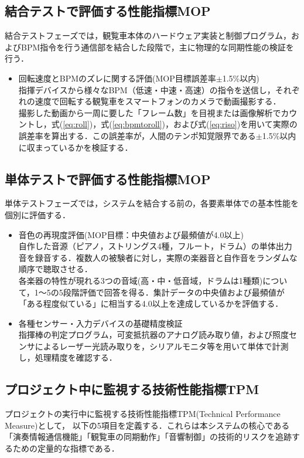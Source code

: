 \documentclass[lualatex,book,paper=a4paper,jafontsize=11.5pt,jafontscale=1.05]{jlreq}
\begin{document}
\subsection{結合テストで評価する性能指標MOP}
結合テストフェーズでは，観覧車本体のハードウェア実装と制御プログラム，およびBPM指令を行う通信部を結合した段階で，主に物理的な同期性能の検証を行う．

\begin{itemize}
	\item 回転速度とBPMのズレに関する評価(MOP目標誤差率$\pm$1.5\%以内)
	\\ 指揮デバイスから様々なBPM（低速・中速・高速）の指令を送信し，それぞれの速度で回転する観覧車をスマートフォンのカメラで動画撮影する．
	\\ 撮影した動画から一周に要した「フレーム数」を目視または画像解析でカウントし，式(\ref{eq:roll})，式(\ref{eq:bpmtoroll})，および式(\ref{eq:riso})を用いて実際の誤差率を算出する．この誤差率が，人間のテンポ知覚限界である$\pm$1.5\%以内に収まっているかを検証する．
\end{itemize}
\subsection{単体テストで評価する性能指標MOP}
単体テストフェーズでは，システムを結合する前の，各要素単体での基本性能を個別に評価する．

\begin{itemize}
	\item 音色の再現度評価(MOP目標：中央値および最頻値が4.0以上)
		\\ 自作した音源（ピアノ，ストリングス4種，フルート，ドラム）の単体出力音を録音する．複数人の被験者に対し，実際の楽器音と自作音をランダムな順序で聴取させる．
		\\ 各楽器の特性が現れる3つの音域(高・中・低音域，ドラムは1種類)について，1〜5の5段階評価で回答を得る．集計データの中央値および最頻値が「ある程度似ている」に相当する4.0以上を達成しているかを評価する．
	
	\item 各種センサー・入力デバイスの基礎精度検証
	\\ 指揮棒の判定プログラム，可変抵抗器のアナログ読み取り値，および照度センサによるレーザー光読み取りを，シリアルモニタ等を用いて単体で計測し，処理精度を確認する．
\end{itemize}

\subsection{プロジェクト中に監視する技術性能指標TPM}
プロジェクトの実行中に監視する技術性能指標TPM(Technical Performance Measure)として，
以下の5項目を定義する．これらは本システムの核心である「演奏情報通信機能」「観覧車の同期動作」「音響制御」の技術的リスクを追跡するための定量的な指標である．
\end{document}
